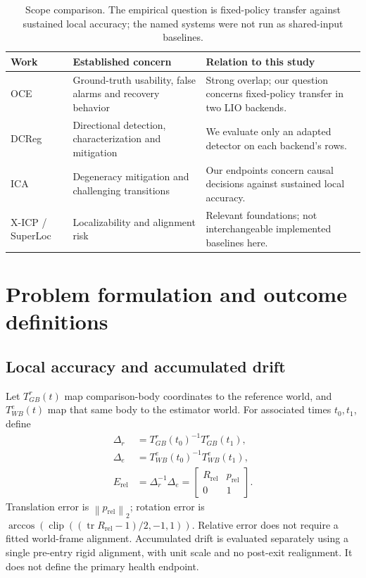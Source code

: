 \documentclass[conference]{IEEEtran}
\newcommand{\norm}[1]{\left\lVert#1\right\rVert}
\begin{document}
\begin{table}[t]
\caption{Scope comparison. The empirical question is fixed-policy transfer
against sustained local accuracy; the named systems were not run as
shared-input baselines.}\label{tab:overlap}
\centering\small
\begin{tabularx}{\linewidth}{@{}p{.15\linewidth}XX@{}}
\toprule Work & Established concern & Relation to this study\\\midrule
OCE & Ground-truth usability, false alarms and recovery behavior & Strong
overlap; our question concerns fixed-policy transfer in two LIO backends.\\
DCReg & Directional detection, characterization and mitigation & We evaluate
only an adapted detector on each backend's rows.\\
ICA & Degeneracy mitigation and challenging transitions & Our endpoints
concern causal decisions against sustained local accuracy.\\
X-ICP / SuperLoc & Localizability and alignment risk & Relevant foundations;
not interchangeable implemented baselines here.\\
\bottomrule
\end{tabularx}
\end{table}

\section{Problem formulation and outcome definitions}
\subsection{Local accuracy and accumulated drift}
Let $T^r_{GB}(t)$ map comparison-body coordinates to the reference world,
and $T^e_{WB}(t)$ map that same body to the estimator world. For associated
times $t_0,t_1$, define
\begin{align}
\Delta_r&=T^r_{GB}(t_0)^{-1}T^r_{GB}(t_1),\\
\Delta_e&=T^e_{WB}(t_0)^{-1}T^e_{WB}(t_1),\\
E_{\mathrm{rel}}&=\Delta_r^{-1}\Delta_e
=\begin{bmatrix}R_{\mathrm{rel}}&p_{\mathrm{rel}}\\0&1\end{bmatrix}.
\end{align}
Translation error is $\norm{p_{\mathrm{rel}}}_2$; rotation error is
$\arccos(\operatorname{clip}((\operatorname{tr}R_{\mathrm{rel}}-1)/2,-1,1))$.
Relative error does not require a fitted world-frame alignment.
Accumulated drift is evaluated separately using a single pre-entry rigid
alignment, with unit scale and no post-exit realignment. It does not define
the primary health endpoint.
\end{document}
